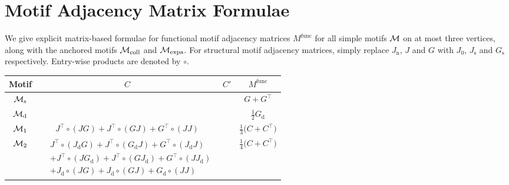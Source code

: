 \chapter{Motif Adjacency Matrix Formulae} \label{chap:appendix_matrices}

We give explicit matrix-based formulae for functional motif adjacency matrices $M^\mathrm{func}$ for all simple motifs $\mathcal{M}$ on at most three vertices, along with the anchored motifs $\mathcal{M}_\mathrm{coll}$ and $\mathcal{M}_\mathrm{expa}$. For structural motif adjacency matrices, simply replace $J_\mathrm{n}$, $J$ and $G$ with $J_0$, $J_\mathrm{s}$ and $G_\mathrm{s}$ respectively. Entry-wise products are denoted by $\circ$.

\vspace*{0.2cm}
\begin{table}[H]

	\centering
	\renewcommand{\arraystretch}{1.8}
	\tiny
	
	\begin{tabular}{ |c|c|c|c| }
	
		\hline	
	
		Motif & $C$ & $C'$ & $M^\mathrm{func}$ \\
		
		\hline
		
		$\mathcal{M}_\mathrm{s}$ & & & $G + G^\top$ \\
		
		\hline
		
		$\mathcal{M}_\mathrm{d}$ & & & $\frac{1}{2} G_\mathrm{d}$ \\
		
		\hline
		
		$\mathcal{M}_1$ & $J^\top \circ (J G) + J^\top \circ (G J) + G^\top \circ (J J)$ & & $\frac{1}{3} \big(C + C^\top\big)$ \\
		
		\hline
		
		$\mathcal{M}_2$ & \rule{0pt}{2.7em}$\displaystyle\begin{aligned} 
       					& J^\top \circ (J_\mathrm{d} G) + J^\top \circ (G_\mathrm{d} J) + G^\top \circ (J_\mathrm{d} J)   \\
       					& + J^\top \circ (J G_\mathrm{d}) + J^\top \circ (G J_\mathrm{d}) + G^\top \circ (J J_\mathrm{d}) \\
       					& + J_\mathrm{d} \circ (J G) + J_\mathrm{d} \circ (G J) + G_\mathrm{d} \circ (J J)
    				\end{aligned}$\rule[-2em]{0pt}{1em} & & $\frac{1}{4} \big(C + C^\top\big)$ \\
    	

\end{tabular}
\end{table}

